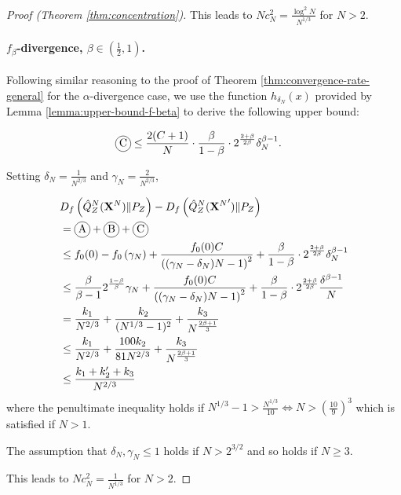 \begin{proof}[Proof (Theorem \ref{thm:concentration})]
This leads to $Nc_N^2 = \frac{\log^2N}{N^{1/3}}$ for $N>2$.


\paragraph{$f_\beta$-divergence, $\beta\in(\frac{1}{2},1)$.}

Following similar reasoning to the proof of Theorem \ref{thm:convergence-rate-general} for the $\alpha$-divergence case, we use the function $h_{\delta_N}(x)$ provided by Lemma \ref{lemma:upper-bound-f-beta} to derive the following upper bound:


\begin{align*}
    \encircle{C} &\leq \frac{2(C+1)}{N} \cdot \frac{\beta}{1-\beta}\cdot 2^{\frac{2+\beta}{2\beta}}\delta_N^{\beta-1}.
\end{align*}

Setting $\delta_N = \frac{1}{N^{2/3}}$ and $\gamma_N =\frac{2}{N^{2/3}}$,

\begin{align*}
    &D_f\left( \hat{Q}_Z^N(\XN) \| P_Z\right) - D_f\left( \hat{Q}_Z^N({\XN}') \| P_Z\right) \\
    &= \encircle{A} + \encircle{B} + \encircle{C} \\
    &\leq f_0(0) - f_0\left(\gamma_N\right) + \frac{f_0(0)C}{\left((\gamma_N-\delta_N)N - 1\right)^2} + \frac{\beta}{1-\beta}\cdot 2^{\frac{2+\beta}{2\beta}}\delta_N^{\beta-1} \\
    &\leq \frac{\beta}{\beta-1}2^{\frac{1-\beta}{\beta}}\gamma_N + \frac{f_0(0)C}{\left((\gamma_N-\delta_N)N - 1\right)^2}+ \frac{\beta}{1-\beta}\cdot 2^{\frac{2+\beta}{2\beta}} \frac{ \delta^{\beta-1}}{N} \\
    &= \frac{k_1}{N^{2/3}} + \frac{k_2}{(N^{1/3} - 1)^2} + \frac{k_3}{N^\frac{2\beta + 1}{3}}\\
    &\leq \frac{k_1}{N^{2/3}} + \frac{100k_2}{81N^{2/3}} + \frac{k_3}{N^\frac{2\beta + 1}{3}}\\
    &\leq \frac{k_1+k'_2 + k_3}{N^{2/3}}
\end{align*}
where the penultimate inequality holds if $N^{1/3}-1 > \frac{N^{1/3}}{10} \iff N>\left(\frac{10}{9}\right)^3$ which is satisfied if $N>1$.

The assumption that $\delta_N, \gamma_N \leq 1$ holds if $N>2^{3/2}$ and so holds if $N\geq3$.

This leads to $Nc_N^2 = \frac{1}{N^{1/3}}$ for $N>2$.


\end{proof}

